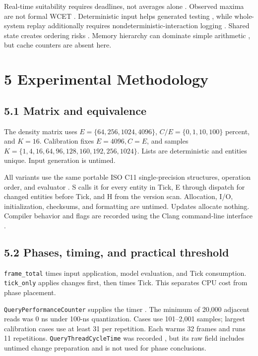 Real-time suitability requires deadlines, not averages alone \cite{liu1973,buttazzo2011}. Observed maxima are not formal WCET \cite{wilhelm2008}. Deterministic input helps generated testing \cite{claessen2000}, while whole-system replay additionally requires nondeterministic-interaction logging \cite{dunlap2002,srinivasan2004}. Shared state creates ordering risks \cite{lu2008}. Memory hierarchy can dominate simple arithmetic \cite{hennessy2017}, but cache counters are absent here.

\section{5 Experimental Methodology}

\subsection{5.1 Matrix and equivalence}

The density matrix uses \(E=\{64,256,1024,4096\}\), \(C/E=\{0,1,10,100\}\) percent, and \(K=16\). Calibration fixes \(E=4096,C=E\), and samples \(K=\{1,4,16,64,96,128,160,192,256,1024\}\). Lists are deterministic and entities unique. Input generation is untimed.

All variants use the same portable ISO C11 single-precision structures, operation order, and evaluator \cite{c11}. S calls it for every entity in Tick, E through dispatch for changed entities before Tick, and H from the version scan. Allocation, I/O, initialization, checksums, and formatting are untimed. Updates allocate nothing. Compiler behavior and flags are recorded using the Clang command-line interface \cite{clangdocs}.

\subsection{5.2 Phases, timing, and practical threshold}

\texttt{frame\_total} times input application, model evaluation, and Tick consumption. \texttt{tick\_only} applies changes first, then times Tick. This separates CPU cost from phase placement.

\texttt{QueryPerformanceCounter} supplies the timer \cite{microsoftqpc}. The minimum of 20,000 adjacent reads was 0 ns under 100-ns quantization. Cases use 101--2,001 samples; largest calibration cases use at least 31 per repetition. Each warms 32 frames and runs 11 repetitions. \texttt{QueryThreadCycleTime} was recorded \cite{microsoftcycles}, but its raw field includes untimed change preparation and is not used for phase conclusions.

